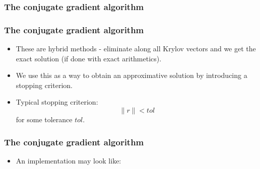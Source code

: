 \documentclass{beamer}
\begin{document}
\begin{frame}\frametitle{The conjugate gradient algorithm}
\begin{center}
\end{center}
\end{frame}

\begin{frame}\frametitle{The conjugate gradient algorithm}
  \begin{itemize}
    \item These are hybrid methods - eliminate along all Krylov vectors
        and we get the exact solution (if done with exact arithmetics).
    \item We use this as a way to obtain an approximative solution  
      by introducing a stopping criterion.
    \item Typical stopping criterion:
      \[
        \|r\| < tol
      \]
      for some tolerance $tol$.
  \end{itemize}
\end{frame}

\begin{frame}\frametitle{The conjugate gradient algorithm}
  \begin{itemize}
    \item An implementation may look like:
      
  \end{itemize}
\end{frame}
\end{document}
